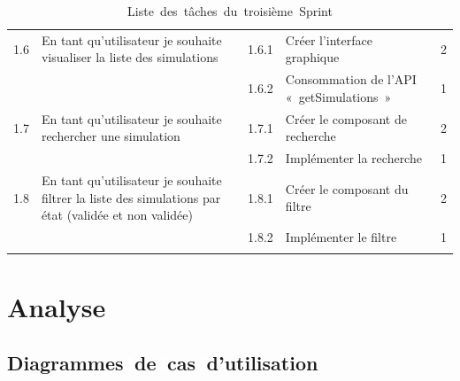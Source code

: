 \begin{longtable}[!ht]{|m{1cm}|m{3cm}|m{1cm}|m{7cm}|m{1.3cm}|}
\hline
1.6 & En tant qu’utilisateur je souhaite visualiser la liste des simulations & 1.6.1 & Créer l’interface graphique  & 2 \\
\cline{3-5}
&& 1.6.2 & Consommation de l’API « getSimulations » & 1 \\

\hline
1.7 & En tant qu’utilisateur je souhaite rechercher une simulation  & 1.7.1 & Créer le composant de recherche & 2 \\
\cline{3-5}
&& 1.7.2 & Implémenter la recherche & 1 \\

\hline
1.8 & En tant qu’utilisateur je souhaite filtrer la liste des simulations par état (validée et non validée) & 1.8.1 & Créer le composant du filtre & 2 \\
\cline{3-5}
&& 1.8.2 & Implémenter le filtre & 1 \\

\hline
\caption{Liste\textcolor{white}{J}des\textcolor{white}{J}tâches\textcolor{white}{J}du\textcolor{white}{J}troisième\textcolor{white}{J}Sprint}
\label{tab:tab-s5}
\end{longtable}


\newpage
\section{Analyse}
\subsection{Diagrammes\textcolor{white}{J}de\textcolor{white}{J}cas\textcolor{white}{J}d’utilisation}



